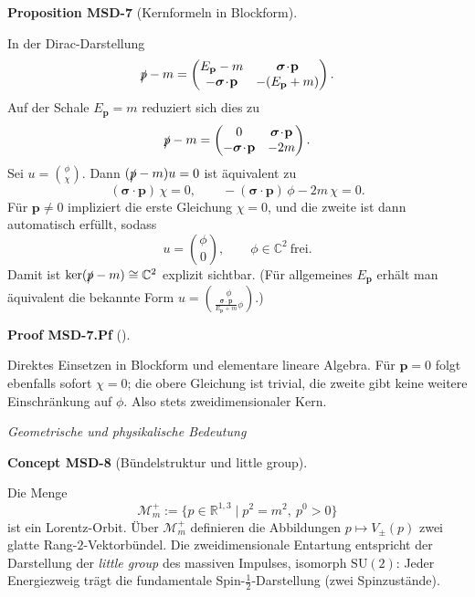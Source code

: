 \documentclass[10pt, letterpaper]{article}
\newcommand{\R}{\mathbb{R}}
\newcommand{\C}{\mathbb{C}}
\newcommand{\CustomHeading}[3]{%
  \par\medskip\noindent%
  \textbf{#1 #2} \textnormal{(#3)}.\enskip%
}
\newenvironment{PROP}[2]{\begin{unitbox}\CustomHeading{Proposition}{#1}{#2}}{\end{unitbox}}
\newenvironment{CONC}[2]{\begin{unitbox}\CustomHeading{Concept}{#1}{#2}}{\end{unitbox}}
\newenvironment{PROOF}[2]{\begin{unitbox}\CustomHeading{Proof}{#1}{#2}}{\end{unitbox}}
\begin{document}
\begin{PROP}{MSD-7}{Kernformeln in Blockform}
In der Dirac-Darstellung
\[
\slashed p - m=
\begin{pmatrix}
E_{\mathbf p}-m & \boldsymbol\sigma\!\cdot\!\mathbf p\\
-\boldsymbol\sigma\!\cdot\!\mathbf p & -(E_{\mathbf p}+m)
\end{pmatrix}.
\]
Auf der Schale $E_{\mathbf p}=m$ reduziert sich dies zu
\[
\slashed p - m=
\begin{pmatrix}
0 & \boldsymbol\sigma\!\cdot\!\mathbf p\\
-\boldsymbol\sigma\!\cdot\!\mathbf p & -2m
\end{pmatrix}.
\]
Sei $u=\binom{\phi}{\chi}$. Dann $(\slashed p-m)u=0$ ist äquivalent zu
\[
(\boldsymbol\sigma\!\cdot\!\mathbf p)\,\chi=0,\qquad
-(\boldsymbol\sigma\!\cdot\!\mathbf p)\,\phi-2m\,\chi=0.
\]
Für $\mathbf p\neq 0$ impliziert die erste Gleichung $\chi=0$, und die zweite ist dann automatisch erfüllt, sodass
\[
u=\binom{\phi}{0},\qquad \phi\in\C^2\ \text{frei}.
\]
Damit ist $\ker(\slashed p-m)\cong\C^2$ explizit sichtbar. (Für allgemeines $E_{\mathbf p}$ erhält man äquivalent die bekannte Form $u=\binom{\phi}{\tfrac{\boldsymbol\sigma\cdot\mathbf p}{E_{\mathbf p}+m}\phi}$.)
\end{PROP}

\begin{PROOF}{MSD-7.Pf}{}
Direktes Einsetzen in Blockform und elementare lineare Algebra. Für $\mathbf p=0$ folgt ebenfalls sofort $\chi=0$; die obere Gleichung ist trivial, die zweite gibt keine weitere Einschränkung auf $\phi$. Also stets zweidimensionaler Kern.
\end{PROOF}

\emph{Geometrische und physikalische Bedeutung}

\begin{CONC}{MSD-8}{Bündelstruktur und little group}
Die Menge
\[
\mathcal M_m^+:=\{p\in\R^{1,3}\mid p^2=m^2,\ p^0>0\}
\]
ist ein Lorentz-Orbit. Über $\mathcal M_m^+$ definieren die Abbildungen $p\mapsto V_\pm(p)$ zwei glatte Rang-$2$-Vektorbündel.  
Die zweidimensionale Entartung entspricht der Darstellung der \emph{little group} des massiven Impulses, isomorph $\mathrm{SU}(2)$: Jeder Energiezweig trägt die fundamentale Spin-$\tfrac12$-Darstellung (zwei Spinzustände).
\end{CONC}
\end{document}
